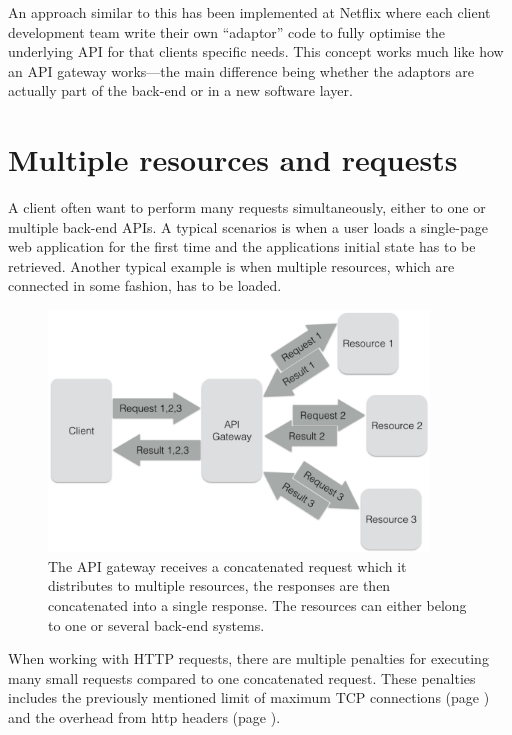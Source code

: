 \documentclass{cslthse-msc}
\begin{document}
An approach similar to this has been implemented at Netflix where each client development team write their own \enquote{adaptor} code to fully optimise the underlying API for that clients specific needs\cite{netflix}. This concept works much like how an API gateway works---the main difference being whether the adaptors are actually part of the back-end or in a new software layer.

\section{Multiple resources and requests}
A client often want to perform many requests simultaneously, either to one or multiple back-end APIs. A typical scenarios is when a user loads a single-page web application for the first time and the applications initial state has to be retrieved. Another typical example is when multiple resources, which are connected in some fashion, has to be loaded.

\begin{figure}[H]
  \centering
    \begin{center}
      \includegraphics[width=0.9\textwidth]{images/api_gateway_concatenation.png}
    \end{center}
  \caption{The API gateway receives a concatenated request which it distributes to multiple resources, the responses are then concatenated into a single response. The resources can either belong to one or several back-end systems.}
\end{figure}

When working with HTTP requests, there are multiple penalties for executing many small requests compared to one concatenated request. These penalties includes the previously mentioned limit of maximum TCP connections (page \pageref{max_tcp}) and the overhead from http headers (page \pageref{headers}). 
\end{document}
